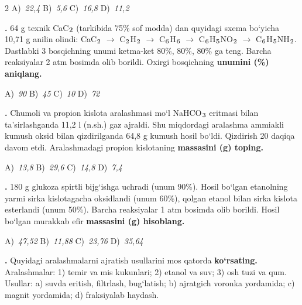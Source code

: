 \documentclass[11pt,a4paper]{article}
\renewcommand{\textsubscript}[1]{\ensuremath{_{\text{\fontsize{8}{8}\selectfont #1}}}}
\newcommand{\qn}[1]{\textbf{\fontsize{11.5}{13}\selectfont #1}}
\newcommand{\qsep}{\par\vspace{13pt}}
\begin{document}
\begin{multicols}{2}
\noindent A)~\textsl{22,4} \hfill B)~\textsl{5,6} \hfill C)~\textsl{16,8} \hfill D)~\textsl{11,2}\par
\qsep
\noindent\qn{27.} 64 g texnik CaC\textsubscript{2} (tarkibida 75\% sof modda) dan quyidagi sxema bo`yicha 10,71 g anilin olindi: CaC\textsubscript{2} $\to$ C\textsubscript{2}H\textsubscript{2} $\to$ C\textsubscript{6}H\textsubscript{6} $\to$ C\textsubscript{6}H\textsubscript{5}NO\textsubscript{2} $\to$ C\textsubscript{6}H\textsubscript{5}NH\textsubscript{2}. Dastlabki 3 bosqichning unumi ketma-ket 80\%, 80\%, 80\% ga teng. Barcha reaksiyalar 2 atm bosimda olib borildi. Oxirgi bosqichning \textbf{unumini (\%) aniqlang.}

\noindent A)~\textsl{90} \hfill B)~\textsl{45} \hfill C)~\textsl{10} \hfill D)~\textsl{72}\par
\qsep
\noindent\qn{28.} Chumoli va propion kislota aralashmasi mo`l NaHCO\textsubscript{3} eritmasi bilan ta'sirlashganda 11,2 l (n.sh.) gaz ajraldi. Shu miqdordagi aralashma ammiakli kumush oksid bilan qizdirilganda 64,8 g kumush hosil bo`ldi. Qizdirish 20 daqiqa davom etdi. Aralashmadagi propion kislotaning \textbf{massasini (g) toping.}

\noindent A)~\textsl{13,8} \hfill B)~\textsl{29,6} \hfill C)~\textsl{14,8} \hfill D)~\textsl{7,4}\par
\qsep
\noindent\qn{29.} 180 g glukoza spirtli bijg`ishga uchradi (unum 90\%). Hosil bo`lgan etanolning yarmi sirka kislotagacha oksidlandi (unum 60\%), qolgan etanol bilan sirka kislota esterlandi (unum 50\%). Barcha reaksiyalar 1 atm bosimda olib borildi. Hosil bo`lgan murakkab efir \textbf{massasini (g) hisoblang.}

\noindent A)~\textsl{47,52} \hfill B)~\textsl{11,88} \hfill C)~\textsl{23,76} \hfill D)~\textsl{35,64}\par
\qsep
\noindent\qn{30.} Quyidagi aralashmalarni ajratish usullarini mos qatorda \textbf{ko`rsating.} Aralashmalar: 1) temir va mis kukunlari; 2) etanol va suv; 3) osh tuzi va qum. Usullar: a) suvda eritish, filtrlash, bug`latish; b) ajratgich voronka yordamida; c) magnit yordamida; d) fraksiyalab haydash.


\end{multicols}
\end{document}
